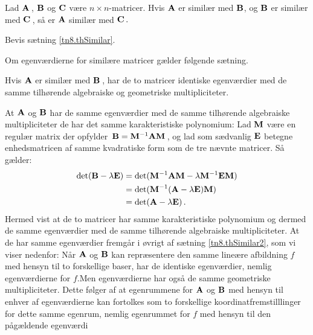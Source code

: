 \begin{theorem}\label{tn8.thSimilar}
Lad $\mathbf{A}\,$, $\mathbf{B}$ og $\mathbf{C}$ være $n\times n$-matricer. Hvis $\mathbf{A}$ er similær med $\mathbf{B}$, og $\mathbf{B}$ er similær med $\mathbf{C}\,$, så er $\mathbf{A}$ similær med $\mathbf{C}\,.$
 
\end{theorem}

\begin{exercise}
Bevis sætning \ref{tn8.thSimilar}.
\end{exercise}

Om egenværdierne for similære matricer gælder følgende sætning.

\begin{theorem} \label{saet.sim}
Hvis $ \mathbf{A} $ er similær med $\mathbf{B}\,$, har de to matricer identiske egenværdier med de samme tilhørende algebraiske og geometriske multipliciteter.
\end{theorem}
\begin{bevis}
At $ \mathbf{A} $ og $\mathbf{B}$ har de samme egenværdier med de samme tilhørende  algebraiske multipliciteter de har det samme karakteristiske polynomium: Lad $\mathbf{M}$ være en regulær matrix der opfylder $\,\mathbf{B} = \mathbf{M}^{-1} \mathbf{A} \mathbf{M}\,$, og lad som sædvanlig $\mathbf{E}$ betegne enhedsmatricen af samme kvadratiske form som de tre nævnte matricer. Så gælder:
\begin{equation}
\begin{aligned}
\det(\mathbf{B} - \lambda\mathbf{E}) &= \det(\mathbf{M}^{-1} \mathbf{A} \mathbf{M} - \lambda \mathbf{M}^{-1} \mathbf{E} \mathbf{M}) \\
&= \det(\mathbf{M}^{-1}(\mathbf{A} - \lambda\mathbf{E})\mathbf{M}) \\
&= \det(\mathbf{A} - \lambda\mathbf{E})\,.
\end{aligned}
\end{equation}
Hermed vist at de to matricer har samme karakteristiske polynomium og dermed de samme egenværdier med de samme tilhørende  algebraiske multipliciteter. At de har samme egenværdier fremgår i øvrigt af sætning \ref{tn8.thSimilar2}, som vi viser nedenfor: Når $\mathbf{A}$ og $\mathbf{B}$ kan repræsentere den samme lineære afbildning $f$ med hensyn til to forskellige baser, har de identiske egenværdier, nemlig egenværdierne for $f$.\bs Men egenværdierne har også de samme geometriske multipliciteter. Dette følger af at egenrummene for $\mathbf{A}$ og $\mathbf{B}$ med hensyn til enhver af egenværdierne kan fortolkes som to forskellige koordinatfremstilllinger for dette samme egenrum, nemlig egenrummet for $f$ med hensyn til den pågældende egenværdi 
\end{bevis}

